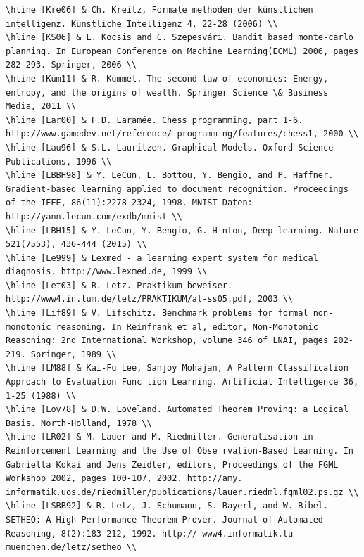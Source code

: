\documentclass[10pt]{article}
\begin{document}
\begin{verbatim}
\hline [Kre06] & Ch. Kreitz, Formale methoden der künstlichen intelligenz. Künstliche Intelligenz 4, 22-28 (2006) \\
\hline [KS06] & L. Kocsis and C. Szepesvári. Bandit based monte-carlo planning. In European Conference on Machine Learning(ECML) 2006, pages 282-293. Springer, 2006 \\
\hline [Küm11] & R. Kümmel. The second law of economics: Energy, entropy, and the origins of wealth. Springer Science \& Business Media, 2011 \\
\hline [Lar00] & F.D. Laramée. Chess programming, part 1-6. http://www.gamedev.net/reference/ programming/features/chess1, 2000 \\
\hline [Lau96] & S.L. Lauritzen. Graphical Models. Oxford Science Publications, 1996 \\
\hline [LBBH98] & Y. LeCun, L. Bottou, Y. Bengio, and P. Haffner. Gradient-based learning applied to document recognition. Proceedings of the IEEE, 86(11):2278-2324, 1998. MNIST-Daten: http://yann.lecun.com/exdb/mnist \\
\hline [LBH15] & Y. LeCun, Y. Bengio, G. Hinton, Deep learning. Nature 521(7553), 436-444 (2015) \\
\hline [Le999] & Lexmed - a learning expert system for medical diagnosis. http://www.lexmed.de, 1999 \\
\hline [Let03] & R. Letz. Praktikum beweiser. http://www4.in.tum.de/letz/PRAKTIKUM/al-ss05.pdf, 2003 \\
\hline [Lif89] & V. Lifschitz. Benchmark problems for formal non-monotonic reasoning. In Reinfrank et al, editor, Non-Monotonic Reasoning: 2nd International Workshop, volume 346 of LNAI, pages 202-219. Springer, 1989 \\
\hline [LM88] & Kai-Fu Lee, Sanjoy Mohajan, A Pattern Classification Approach to Evaluation Func tion Learning. Artificial Intelligence 36, 1-25 (1988) \\
\hline [Lov78] & D.W. Loveland. Automated Theorem Proving: a Logical Basis. North-Holland, 1978 \\
\hline [LR02] & M. Lauer and M. Riedmiller. Generalisation in Reinforcement Learning and the Use of Obse rvation-Based Learning. In Gabriella Kokai and Jens Zeidler, editors, Proceedings of the FGML Workshop 2002, pages 100-107, 2002. http://amy. informatik.uos.de/riedmiller/publications/lauer.riedml.fgml02.ps.gz \\
\hline [LSBB92] & R. Letz, J. Schumann, S. Bayerl, and W. Bibel. SETHEO: A High-Performance Theorem Prover. Journal of Automated Reasoning, 8(2):183-212, 1992. http:// www4.informatik.tu-muenchen.de/letz/setheo \\

\end{verbatim}
\end{document}
